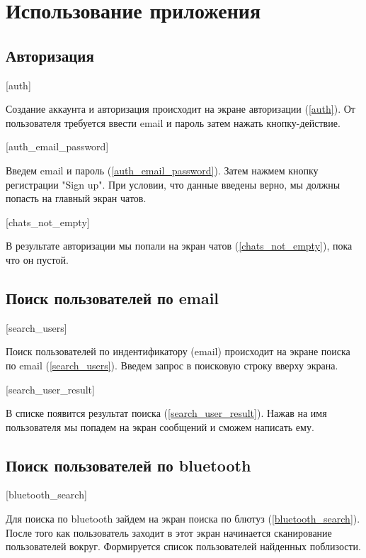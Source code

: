 \documentclass[opermanual]{espd}
\begin{document}
\section{Использование приложения}

\subsection{Авторизация}

[auth]

Создание аккаунта и авторизация происходит на экране авторизации (\ref{auth}).
От пользователя требуется ввести email и пароль затем нажать кнопку-действие.

[auth_email_password]

Введем email и пароль (\ref{auth_email_password}). Затем нажмем кнопку регистрации "Sign up". При условии, что данные введены верно, мы должны попасть на главный экран чатов.

[chats_not_empty]

В результате авторизации мы попали на экран чатов (\ref{chats_not_empty}), пока что он пустой.

\subsection{Поиск пользователей по email}

[search_users]

Поиск пользователей по индентификатору (email) происходит на экране поиска по email (\ref{search_users}). Введем запрос в поисковую строку вверху экрана.

[search_user_result]

В списке появится результат поиска (\ref{search_user_result}). Нажав на имя пользователя мы попадем на экран сообщений и сможем написать ему.

\subsection{Поиск пользователей по bluetooth}

[bluetooth_search]

Для поиска по bluetooth зайдем на экран поиска по блютуз (\ref{bluetooth_search}). После того как пользователь заходит в этот экран начинается сканирование пользователей вокруг. Формируется список пользователей найденных поблизости.
\end{document}
